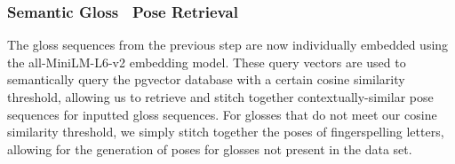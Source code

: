 \documentclass[../paper.tex]{subfiles}
\begin{document}
\subsubsection*{Semantic Gloss \textrightarrow\ Pose Retrieval}
The gloss sequences from the previous step are now individually embedded using the all-MiniLM-L6-v2 embedding model. These query vectors are used to semantically query the pgvector database with a certain cosine similarity threshold, allowing us to retrieve and stitch together contextually-similar pose sequences for inputted gloss sequences. For glosses that do not meet our cosine similarity threshold, we simply stitch together the poses of fingerspelling letters, allowing for the generation of poses for glosses not present in the data set.
\end{document}
